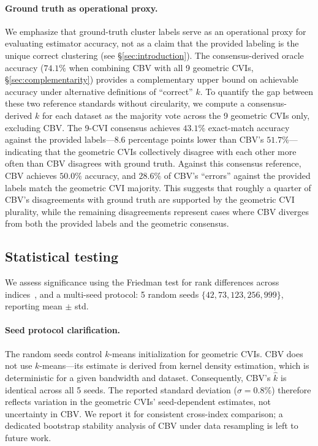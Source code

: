 \documentclass[journal]{IEEEtran}
\begin{document}
\paragraph{Ground truth as operational proxy.}
We emphasize that ground-truth cluster labels serve as an operational proxy for evaluating estimator accuracy, not as a claim that the provided labeling is the unique correct clustering (see §\ref{sec:introduction}). The consensus-derived oracle accuracy ($74.1\%$ when combining CBV with all 9 geometric CVIs, §\ref{sec:complementarity}) provides a complementary upper bound on achievable accuracy under alternative definitions of ``correct'' $k$. To quantify the gap between these two reference standards without circularity, we compute a consensus-derived $k$ for each dataset as the majority vote across the 9 geometric CVIs only, excluding CBV. The 9-CVI consensus achieves $43.1\%$ exact-match accuracy against the provided labels---$8.6$ percentage points lower than CBV's $51.7\%$---indicating that the geometric CVIs collectively disagree with each other more often than CBV disagrees with ground truth. Against this consensus reference, CBV achieves $50.0\%$ accuracy, and $28.6\%$ of CBV's ``errors'' against the provided labels match the geometric CVI majority. This suggests that roughly a quarter of CBV's disagreements with ground truth are supported by the geometric CVI plurality, while the remaining disagreements represent cases where CBV diverges from both the provided labels and the geometric consensus.

\subsection{Statistical testing}
\label{sec:statistical-tests}

We assess significance using the Friedman test for rank differences across indices~\cite{demsar2006statistical}, and a multi-seed protocol: 5 random seeds $\{42, 73, 123, 256, 999\}$, reporting mean $\pm$ std.

\paragraph{Seed protocol clarification.}
The random seeds control $k$-means initialization for geometric CVIs. CBV does not use $k$-means---its estimate is derived from kernel density estimation, which is deterministic for a given bandwidth and dataset. Consequently, CBV's $\hat{k}$ is identical across all 5 seeds. The reported standard deviation ($\sigma = 0.8\%$) therefore reflects variation in the geometric CVIs' seed-dependent estimates, not uncertainty in CBV. We report it for consistent cross-index comparison; a dedicated bootstrap stability analysis of CBV under data resampling is left to future work.
\end{document}
